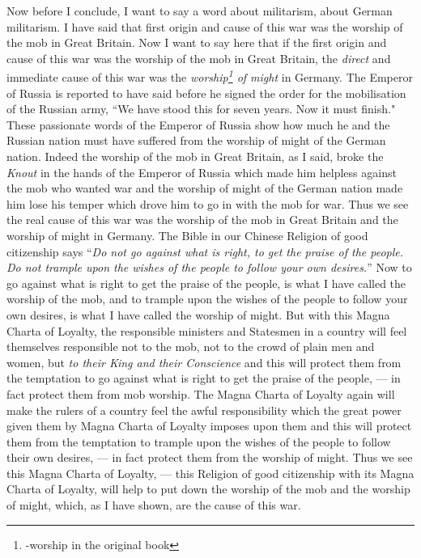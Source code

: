 Now before I conclude, I want to say a word about militarism, about German militarism.
I have said that first origin and cause of this war was the worship of the mob in Great Britain.
Now I want to say here that if the first origin and cause of this war was the worship of the mob in Great Britain, the \emph{direct} and immediate cause of this war was the \emph{worship\footnote{-worship in the original book} of might} in Germany.
The Emperor of Russia is reported to have said before he signed the order for the mobilisation of the Russian army, ``We have stood this for seven years. Now it must finish."
These passionate words of the Emperor of Russia show how much he and the Russian nation must have suffered from the worship of might of the German nation.
Indeed the worship of the mob in Great Britain, as I said, broke the \emph{Knout} in the hands of the Emperor of Russia which made him helpless against the mob who wanted war and the worship of might of the German nation made him lose his temper which drove him to go in with the mob for war.
Thus we see the real cause of this war was the worship of the mob in Great Britain and the worship of might in Germany.
The Bible in our Chinese Religion of good citizenship says ``\emph{Do not go against what is right, to get the praise of the people. Do not trample upon the wishes of the people to follow your own desires.}''\cite{num30} 
Now to go against what is right to get the praise of the people, is what I have called the worship of the mob, and to trample upon the wishes of the people to follow your own desires, is what I have called the worship of might.
But with this Magna Charta of Loyalty, the responsible ministers and Statesmen in a country will feel themselves responsible not to the mob, not to the crowd of plain men and women, but \emph{to their King and their Conscience} and this will protect them from the temptation to go against what is right to get the praise of the people, --- in fact protect them from mob worship.
The Magna Charta of Loyalty again will make the rulers of a country feel the awful responsibility which the great power given them by Magna Charta of Loyalty imposes upon them and this will protect them from the temptation to trample upon the wishes of the people to follow their own desires, --- in fact protect them from the worship of might.
Thus we see this Magna Charta of Loyalty, --- this Religion of good citizenship with its Magna Charta of Loyalty, will help to put down the worship of the mob and the worship of might, which, as I have shown, are the cause of this war.

